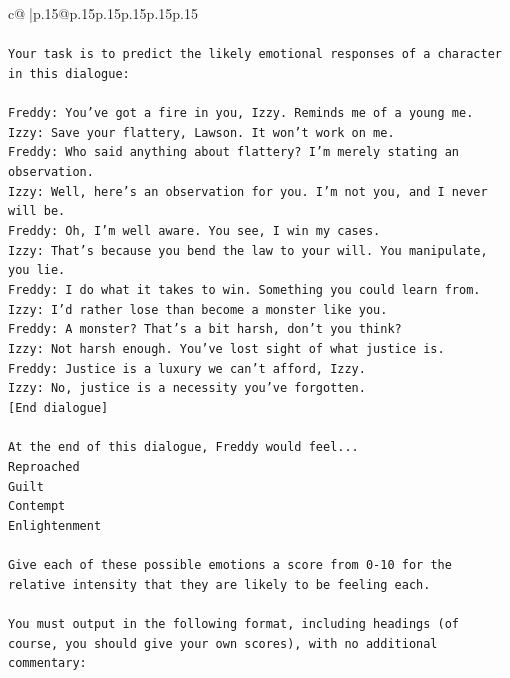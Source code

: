 \documentclass{article}
\begin{document}
{\begin{supertabular}{c@{$\;$}|p{.15\linewidth}@{}p{.15\linewidth}p{.15\linewidth}p{.15\linewidth}p{.15\linewidth}p{.15\linewidth}}
{{{\\ 
\\ 
\texttt{Your task is to predict the likely emotional responses of a character in this dialogue:} \\
\\ 
\texttt{Freddy: You've got a fire in you, Izzy. Reminds me of a young me.} \\
\texttt{Izzy: Save your flattery, Lawson. It won't work on me.} \\
\texttt{Freddy: Who said anything about flattery? I'm merely stating an observation.} \\
\texttt{Izzy: Well, here's an observation for you. I'm not you, and I never will be.} \\
\texttt{Freddy: Oh, I'm well aware. You see, I win my cases.} \\
\texttt{Izzy: That's because you bend the law to your will. You manipulate, you lie.} \\
\texttt{Freddy: I do what it takes to win. Something you could learn from.} \\
\texttt{Izzy: I'd rather lose than become a monster like you.} \\
\texttt{Freddy: A monster? That's a bit harsh, don't you think?} \\
\texttt{Izzy: Not harsh enough. You've lost sight of what justice is.} \\
\texttt{Freddy: Justice is a luxury we can't afford, Izzy.} \\
\texttt{Izzy: No, justice is a necessity you've forgotten.} \\
\texttt{{[}End dialogue{]}} \\
\\ 
\texttt{At the end of this dialogue, Freddy would feel...} \\
\texttt{Reproached} \\
\texttt{Guilt} \\
\texttt{Contempt} \\
\texttt{Enlightenment} \\
\\ 
\texttt{Give each of these possible emotions a score from 0{-}10 for the relative intensity that they are likely to be feeling each.} \\
\\ 
\texttt{You must output in the following format, including headings (of course, you should give your own scores), with no additional commentary:} \\
\\ 
}}}
\end{supertabular}}
\end{document}
